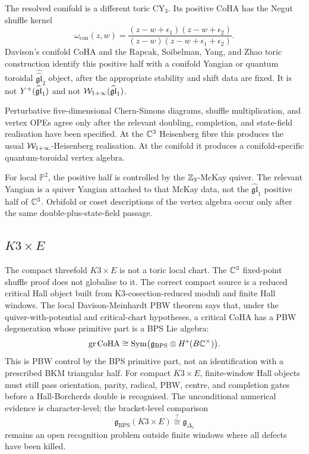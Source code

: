 The resolved conifold is a different toric CY\(_3\).  Its positive CoHA
has the Negut shuffle kernel
\[
  \omega_{\mathrm{con}}(z,w)
  =
  \frac{(z-w+\epsilon_1)(z-w+\epsilon_2)}
       {(z-w)(z-w+\epsilon_1+\epsilon_2)}.
\]
Davison's conifold CoHA and the Rapcak, Soibelman, Yang, and Zhao
toric construction identify this positive half with a conifold
Yangian or quantum toroidal \(\widehat{\widehat{\mathfrak{gl}}}_2\)
object, after the appropriate stability and shift data are fixed.  It
is not \(Y^{+}(\widehat{\mathfrak{gl}}_1)\) and not \(\mathcal{W}_{1+\infty}(\widehat{\mathfrak{gl}}_1)\).

Perturbative five-dimensional Chern-Simons diagrams, shuffle
multiplication, and vertex OPEs agree only after the relevant
doubling, completion, and state-field realisation have been specified.
At the \(\mathbb{C}^3\) Heisenberg fibre this produces the usual
\(\mathcal{W}_{1+\infty}\)-Heisenberg realisation.  At the conifold it produces a
conifold-specific quantum-toroidal vertex algebra.

For local \(\mathbb P^2\), the positive half is controlled by the
\(\mathbb{Z}_3\)-McKay quiver.  The relevant Yangian is a quiver Yangian
attached to that McKay data, not the \(\widehat{\mathfrak{gl}}_1\)
positive half of \(\mathbb{C}^3\).  Orbifold or coset descriptions of the
vertex algebra occur only after the same double-plus-state-field
passage.

\subsection*{\texorpdfstring{$K3\times E$}{K3 x E}}

The compact threefold \(K3\times E\) is not a toric local chart.  The
\(\mathbb{C}^3\) fixed-point shuffle proof does not globalise to it.  The
correct compact source is a reduced critical Hall object built from
K3-cosection-reduced moduli and finite Hall windows.  The local
Davison-Meinhardt PBW theorem says that, under the quiver-with-potential
and critical-chart hypotheses, a critical CoHA has a PBW degeneration
whose primitive part is a BPS Lie algebra:
\[
  \operatorname{gr}\mathrm{CoHA}
  \cong
  \operatorname{Sym}\bigl(\mathfrak g_{\mathrm{BPS}}\otimes H^*(B\mathbb{C}^\times)\bigr).
\]
This is PBW control by the BPS primitive part, not an identification
with a prescribed BKM triangular half.
For compact \(K3\times E\), finite-window Hall objects must still pass
orientation, parity, radical, PBW, centre, and completion gates before
a Hall-Borcherds double is recognised.  The
unconditional numerical evidence is character-level; the bracket-level
comparison
\[
  \mathfrak g_{\mathrm{BPS}}(K3\times E)
  \stackrel{?}{\cong}
  \mathfrak g_{\Delta_5}
\]
remains an open recognition problem outside finite windows where all
defects have been killed.

